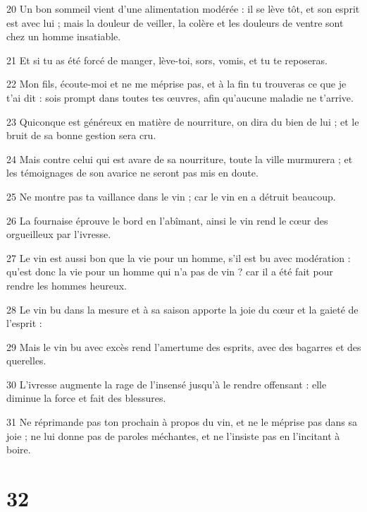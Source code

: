 \par 20 Un bon sommeil vient d'une alimentation modérée : il se lève tôt, et son esprit est avec lui ; mais la douleur de veiller, la colère et les douleurs de ventre sont chez un homme insatiable.
\par 21 Et si tu as été forcé de manger, lève-toi, sors, vomis, et tu te reposeras.
\par 22 Mon fils, écoute-moi et ne me méprise pas, et à la fin tu trouveras ce que je t'ai dit : sois prompt dans toutes tes œuvres, afin qu'aucune maladie ne t'arrive.
\par 23 Quiconque est généreux en matière de nourriture, on dira du bien de lui ; et le bruit de sa bonne gestion sera cru.
\par 24 Mais contre celui qui est avare de sa nourriture, toute la ville murmurera ; et les témoignages de son avarice ne seront pas mis en doute.
\par 25 Ne montre pas ta vaillance dans le vin ; car le vin en a détruit beaucoup.
\par 26 La fournaise éprouve le bord en l'abîmant, ainsi le vin rend le cœur des orgueilleux par l'ivresse.
\par 27 Le vin est aussi bon que la vie pour un homme, s'il est bu avec modération : qu'est donc la vie pour un homme qui n'a pas de vin ? car il a été fait pour rendre les hommes heureux.
\par 28 Le vin bu dans la mesure et à sa saison apporte la joie du cœur et la gaieté de l'esprit :
\par 29 Mais le vin bu avec excès rend l'amertume des esprits, avec des bagarres et des querelles.
\par 30 L'ivresse augmente la rage de l'insensé jusqu'à le rendre offensant : elle diminue la force et fait des blessures.
\par 31 Ne réprimande pas ton prochain à propos du vin, et ne le méprise pas dans sa joie ; ne lui donne pas de paroles méchantes, et ne l'insiste pas en l'incitant à boire.

\chapter{32}

